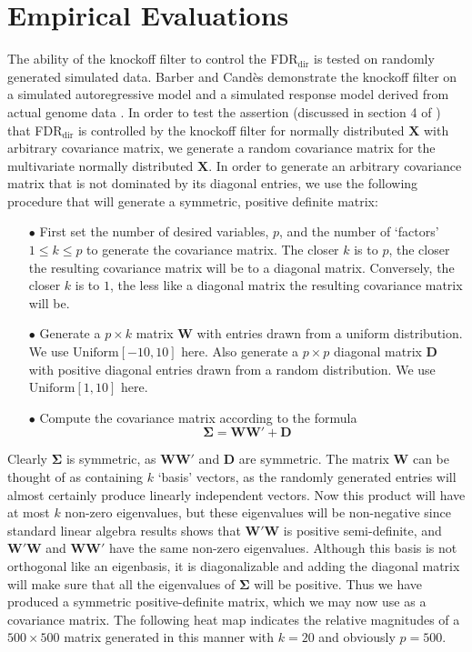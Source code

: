 \documentclass[]{scrartcl}
\newcommand{\1}[1]{\mathbbm{1}_{\left\{#1\right\}}}
\begin{document}
\section{Empirical Evaluations}
The ability of the knockoff filter to control the FDR$_{\text{dir}}$ is tested on randomly generated simulated data. Barber and Cand\`es demonstrate the knockoff filter on a simulated autoregressive model and a simulated response model derived from actual genome data \cite{kohd}. In order to test the assertion (discussed in section 4 of \cite{kohd}) that FDR$_{\text{dir}}$ is controlled by the knockoff filter  for normally distributed $\mathbf{X}$ with arbitrary covariance matrix, we generate a random covariance matrix for the multivariate normally distributed $\mathbf{X}$. In order to generate an arbitrary covariance matrix that is not dominated by its diagonal entries, we use the following procedure that will generate a symmetric, positive definite matrix:
\begin{itemize}
\item[$\bullet$] First set the number of desired variables, $p$, and the number of `factors' $1 \leq k \leq p$ to generate the covariance matrix. The closer $k$ is to $p$, the closer the resulting covariance matrix will be to a diagonal matrix. Conversely, the closer $k$ is to $1$, the less like a diagonal matrix the resulting covariance matrix will be.
\item[$\bullet$] Generate a $p \times k$ matrix $\mathbf{W}$ with entries drawn from a uniform distribution. We use $\text{Uniform}[-10, 10]$ here. Also generate a $p \times p$ diagonal matrix $\mathbf{D}$ with positive diagonal entries drawn from a random distribution. We use $\text{Uniform}[1, 10]$ here.
\item[$\bullet$] Compute the covariance matrix according to the formula
$$ \mathbf{\Sigma} = \mathbf{W}\mathbf{W}' + \mathbf{D}$$
\end{itemize}
Clearly $\mathbf{\Sigma}$ is symmetric, as $\mathbf{W}\mathbf{W}'$ and $\mathbf{D}$ are symmetric. The matrix $\mathbf{W}$ can be thought of as containing $k$ `basis' vectors, as the randomly generated entries will almost certainly produce linearly independent vectors. Now this product will have at most $k$ non-zero eigenvalues, but these eigenvalues will be non-negative since standard linear algebra results shows that $\mathbf{W}'\mathbf{W}$ is positive semi-definite, and $\mathbf{W}'\mathbf{W}$ and $\mathbf{W}\mathbf{W}'$ have the same non-zero eigenvalues. Although this basis is not orthogonal like an eigenbasis, it is diagonalizable and adding the diagonal matrix will make sure that all the eigenvalues of $\mathbf{\Sigma}$ will be positive. Thus we have produced a symmetric positive-definite matrix, which we may now use as a covariance matrix. The following heat map indicates the relative magnitudes of a $500 \times 500$ matrix generated in this manner with $k = 20$ and obviously $p = 500$. 
\end{document}
